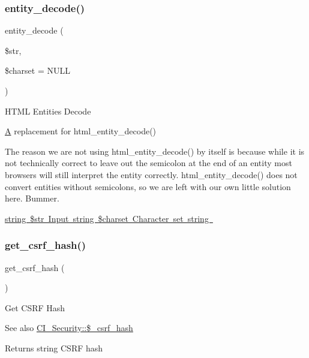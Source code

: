 \subsubsection{\texorpdfstring{entity\+\_\+decode()}{entity\_decode()}}
{\footnotesize\ttfamily entity\+\_\+decode (\begin{DoxyParamCaption}\item[{}]{\$str,  }\item[{}]{\$charset = {\ttfamily NULL} }\end{DoxyParamCaption})}

H\+T\+ML Entities Decode

\mbox{\hyperlink{class_a}{A}} replacement for html\+\_\+entity\+\_\+decode()

The reason we are not using html\+\_\+entity\+\_\+decode() by itself is because while it is not technically correct to leave out the semicolon at the end of an entity most browsers will still interpret the entity correctly. html\+\_\+entity\+\_\+decode() does not convert entities without semicolons, so we are left with our own little solution here. Bummer.

\mbox{\hyperlink{}{string \$str Input  string \$charset Character set  string }}\mbox{\label{class_c_i___security_a1644fd8967db3a1b94988d730ca34991}} 
\subsubsection{\texorpdfstring{get\+\_\+csrf\+\_\+hash()}{get\_csrf\_hash()}}
{\footnotesize\ttfamily get\+\_\+csrf\+\_\+hash (\begin{DoxyParamCaption}{ }\end{DoxyParamCaption})}

Get C\+S\+RF Hash

\begin{DoxySeeAlso}{See also}
\mbox{\hyperlink{class_c_i___security_a8bf24cc529f04164ac20d892ce20d721}{C\+I\+\_\+\+Security\+::\$\+\_\+csrf\+\_\+hash}} 
\end{DoxySeeAlso}
\begin{DoxyReturn}{Returns}
string C\+S\+RF hash 
\end{DoxyReturn}
\mbox{\label{class_c_i___security_a00640f51b90b7d946e9d3a4f0c9f628e}} 
